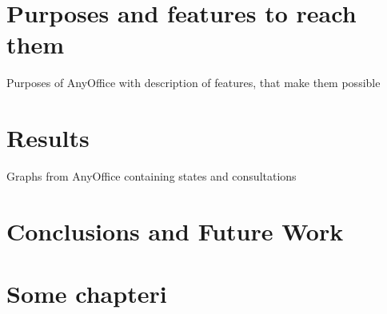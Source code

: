\documentclass[11pt,singleside]{myfithesis2}
\begin{document}
\chapter{Purposes and features to reach them}
Purposes of AnyOffice with description of features, that make them possible

\chapter{Results}
Graphs from AnyOffice containing states and consultations


\chapter{Conclusions and Future Work}

\clearpage
{}
{}


\appendix

\chapter{Some chapteri}
\end{document}
